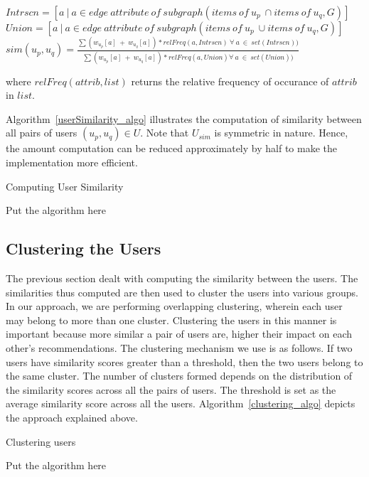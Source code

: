 \documentclass{acm_proc_article-sp}
\begin{document}
$Intrscn = [a\ |\ a \in edge\ attribute\ of\ subgraph(items\ of\ u_p\ \cap items\ of\ u_q, G)]$\\
\newline
$Union = [a\ |\ a \in edge\ attribute\ of\ subgraph(items\ of\ u_p\ \cup items\ of\ u_q, G)]$\\
\newline
$sim(u_p, u_q) = \frac{\sum (w_{u_p}[a]\ +\ w_{u_q}[a])*relFreq(a, Intrscn)\ \forall\ a\ \in\ set(Intrscn))}{\sum (w_{u_p}[a]\ +\ w_{u_q}[a])*relFreq(a, Union) \forall\ a\ \in\ set(Union))}$

where $relFreq(attrib, list)$ returns the relative frequency of occurance of $attrib$ in $list$.

Algorithm~\ref{userSimilarity_algo} illustrates the computation of similarity between all pairs of users $(u_p, u_q) \in U$. Note that $U_{sim}$ is symmetric in nature. Hence, the amount computation can be reduced approximately by half to make the implementation more efficient.

\begin{algorithm}
\label{userSimilarity_algo}
\caption{Computing User Similarity}
\begin{algorithmic}[1]
  \STATE Put the algorithm here
\end{algorithmic}
\end{algorithm}

\subsection{Clustering the Users}
\label{sec:clustering}
The previous section dealt with computing the similarity between the users. The similarities thus computed are then used to cluster the users into various groups. In our approach, we are performing overlapping clustering, wherein each user may belong to more than one cluster. Clustering the users in this manner is important because more similar a pair of users are, higher their impact on each other's recommendations. The clustering mechanism we use is as follows. If two users have similarity scores greater than a threshold, then the two users belong to the same cluster. The number of clusters formed depends on the distribution of the similarity scores across all the pairs of users. The threshold is set as the average similarity score across all the users. Algorithm~\ref{clustering_algo} depicts the approach explained above.

\begin{algorithm}
\label{clustering_algo}
\caption{Clustering users}
\begin{algorithmic}[1]
  \STATE Put the algorithm here
\end{algorithmic}
\end{algorithm}
\end{document}
